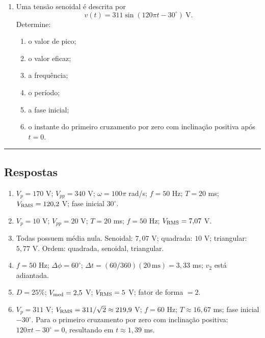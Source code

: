 \documentclass[12pt,a4paper]{article}
\newcommand{\gabarito}{\vspace{0.6em}\hrule\vspace{0.5em}\subsection*{Respostas}\vspace{-0.3em}}
\begin{document}
\begin{enumerate}[label=\textbf{1.\arabic*.}]
Determine:
\begin{enumerate}[label=\alph*)]
    \item ciclo de trabalho;
    \item valor médio;
    \item valor eficaz;
    \item fator de forma $V_{\rm RMS}/V_{\rm med}$.
\end{enumerate}

\item Uma tensão senoidal é descrita por
\[
v(t)=311\sin(120\pi t-30^\circ)\ \text{V}.
\]
Determine:
\begin{enumerate}[label=\alph*)]
    \item o valor de pico;
    \item o valor eficaz;
    \item a frequência;
    \item o período;
    \item a fase inicial;
    \item o instante do primeiro cruzamento por zero com inclinação positiva após $t=0$.
\end{enumerate}

\end{enumerate}

\gabarito

\begin{enumerate}[label=\textbf{1.\arabic*.}]
\item $V_p=170$ V; $V_{pp}=340$ V; $\omega=100\pi$ rad/s; $f=50$ Hz; $T=20$ ms; $V_{\rm RMS}=120{,}2$ V; fase inicial $30^\circ$.
\item $V_p=10$ V; $V_{pp}=20$ V; $T=20$ ms; $f=50$ Hz; $V_{\rm RMS}=7{,}07$ V.
\item Todas possuem média nula. Senoidal: $7{,}07$ V; quadrada: $10$ V; triangular: $5{,}77$ V. Ordem: quadrada, senoidal, triangular.
\item $f=50$ Hz; $\Delta\phi=60^\circ$; $\Delta t=(60/360)(20\,\text{ms})=3{,}33$ ms; $v_2$ está adiantada.
\item $D=25\%$; $V_{\rm med}=2{,}5$ V; $V_{\rm RMS}=5$ V; fator de forma $=2$.
\item $V_p=311$ V; $V_{\rm RMS}=311/\sqrt2\approx219{,}9$ V; $f=60$ Hz; $T\approx16{,}67$ ms; fase inicial $-30^\circ$. Para o primeiro cruzamento por zero com inclinação positiva: $120\pi t-30^\circ=0$, resultando em $t\approx1{,}39$ ms.
\end{enumerate}

\newpage
\end{document}
